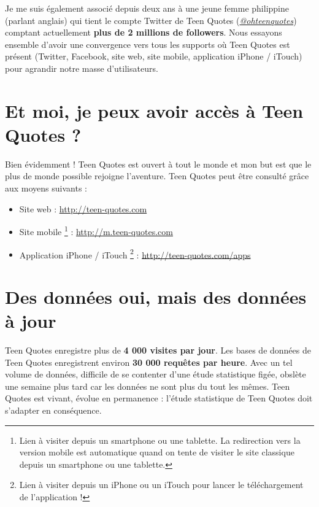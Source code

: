 \documentclass{report}
\begin{document}
	Je me suis également associé depuis deux ans à une jeune femme philippine (parlant anglais) qui tient le compte Twitter de Teen Quotes (\href{http://twitter.com/ohteenquotes}{\textit{@ohteenquotes}}) comptant actuellement \textbf{plus de 2 millions de followers}. Nous essayons ensemble d'avoir une convergence vers tous les supports où Teen Quotes est présent (Twitter, Facebook, site web, site mobile, application iPhone / iTouch) pour agrandir notre masse d'utilisateurs.

	\section{Et moi, je peux avoir accès à Teen Quotes ?}
	Bien évidemment ! Teen Quotes est ouvert à tout le monde et mon but est que le plus de monde possible rejoigne l'aventure. Teen Quotes peut être consulté grâce aux moyens suivants :
	\vspace{10px}
	\begin{itemize}
		\item Site web : \url{http://teen-quotes.com}
		\item Site mobile \footnote{Lien à visiter depuis un smartphone ou une tablette. La redirection vers la version mobile est automatique quand on tente de visiter le site classique depuis un smartphone ou une tablette.} : \url{http://m.teen-quotes.com}
		\item Application iPhone / iTouch \footnote{Lien à visiter depuis un iPhone ou un iTouch pour lancer le téléchargement de l'application !} : \url{http://teen-quotes.com/apps}
	\end{itemize}

	\section{Des données oui, mais des données à jour}
	Teen Quotes enregistre plus de \textbf{4 000 visites par jour}. Les bases de données de Teen Quotes enregistrent environ \textbf{30 000 requêtes par heure}. Avec un tel volume de données, difficile de se contenter d'une étude statistique figée, obslète une semaine plus tard car les données ne sont plus du tout les mêmes. Teen Quotes est vivant, évolue en permanence : l'étude statistique de Teen Quotes doit s'adapter en conséquence.\\
\end{document}
